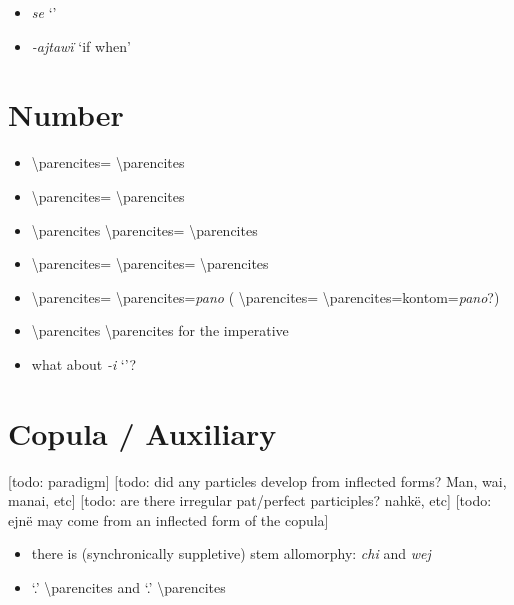 \documentclass{memoir}
\begin{document}
\begin{itemize}
  \begin{itemize}
  \tightlist
  \item
    \emph{se} `'
  \item
    \emph{-ajtawï} `if when'
  \end{itemize}
\end{itemize}

\section{\texorpdfstring{Number \label{sec:verbalnumber}}{Number }}

\begin{itemize}
\tightlist
\item
   \textbackslash parencites=
  \textbackslash parencites
\item
   \textbackslash parencites=
  \textbackslash parencites
\item
   \textbackslash parencites
  \textbackslash parencites= \textbackslash parencites
\item
   \textbackslash parencites=
  \textbackslash parencites= \textbackslash parencites
\item
   \textbackslash parencites=
  \textbackslash parencites=\emph{pano} (
  \textbackslash parencites=
  \textbackslash parencites=kontom=\emph{pano}?)
\item
   \textbackslash parencites \textbackslash parencites
  for the imperative
\item
  what about \emph{-i} `'?
\end{itemize}

\section{Copula / Auxiliary}

{[}todo: paradigm{]} {[}todo: did any particles develop from inflected
forms? Man, wai, manai, etc{]} {[}todo: are there irregular pat/perfect
participles? nahkë, etc{]} {[}todo: ejnë may come from an inflected form
of the copula{]}

\begin{itemize}
\tightlist
\item
  there is (synchronically suppletive) stem allomorphy: \emph{chi} and
  \emph{wej}
\item
   `.' \textbackslash parencites and
   `.' \textbackslash parencites
\end{itemize}
\end{document}
